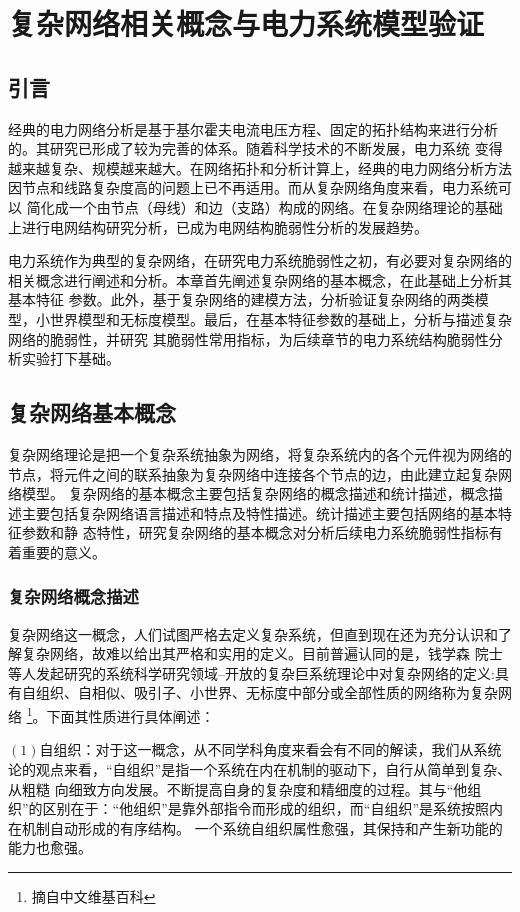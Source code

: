 \chapter{复杂网络相关概念与电力系统模型验证}
\label{cha:model}

\section{引言}
\label{sec:index2}
经典的电力网络分析是基于基尔霍夫电流电压方程、固定的拓扑结构来进行分析的。其研究已形成了较为完善的体系\cite{refs60}。随着科学技术的不断发展，电力系统
变得越来越复杂、规模越来越大。在网络拓扑和分析计算上，经典的电力网络分析方法因节点和线路复杂度高的问题上已不再适用。而从复杂网络角度来看，电力系统可以
简化成一个由节点（母线）和边（支路）构成的网络。在复杂网络理论的基础上进行电网结构研究分析，已成为电网结构脆弱性分析的发展趋势。

电力系统作为典型的复杂网络，在研究电力系统脆弱性之初，有必要对复杂网络的相关概念进行阐述和分析。本章首先阐述复杂网络的基本概念，在此基础上分析其基本特征
参数。此外，基于复杂网络的建模方法，分析验证复杂网络的两类模型，小世界模型和无标度模型。最后，在基本特征参数的基础上，分析与描述复杂网络的脆弱性，并研究
其脆弱性常用指标，为后续章节的电力系统结构脆弱性分析实验打下基础。

\section{复杂网络基本概念}
\label{sec:powersys}
复杂网络理论是把一个复杂系统抽象为网络，将复杂系统内的各个元件视为网络的节点，将元件之间的联系抽象为复杂网络中连接各个节点的边，由此建立起复杂网络模型。
复杂网络的基本概念主要包括复杂网络的概念描述和统计描述，概念描述主要包括复杂网络语言描述和特点及特性描述。统计描述主要包括网络的基本特征参数和静
态特性，研究复杂网络的基本概念对分析后续电力系统脆弱性指标有着重要的意义。

\subsection{复杂网络概念描述}
\label{sec:composite}
复杂网络这一概念，人们试图严格去定义复杂系统，但直到现在还为充分认识和了解复杂网络，故难以给出其严格和实用的定义\cite{refs61}。目前普遍认同的是，钱学森
院士等人发起研究的系统科学研究领域--开放的复杂巨系统理论中对复杂网络的定义:具有自组织、自相似、吸引子、小世界、无标度中部分或全部性质的网络称为复杂网络
\footnote{摘自中文维基百科}。下面其性质进行具体阐述：

$(1)$自组织：对于这一概念，从不同学科角度来看会有不同的解读，我们从系统论的观点来看，“自组织”是指一个系统在内在机制的驱动下，自行从简单到复杂、从粗糙
向细致方向发展。不断提高自身的复杂度和精细度的过程。其与“他组织”的区别在于：“他组织”是靠外部指令而形成的组织，而“自组织”是系统按照内在机制自动形成的有序结构。
一个系统自组织属性愈强，其保持和产生新功能的能力也愈强。

